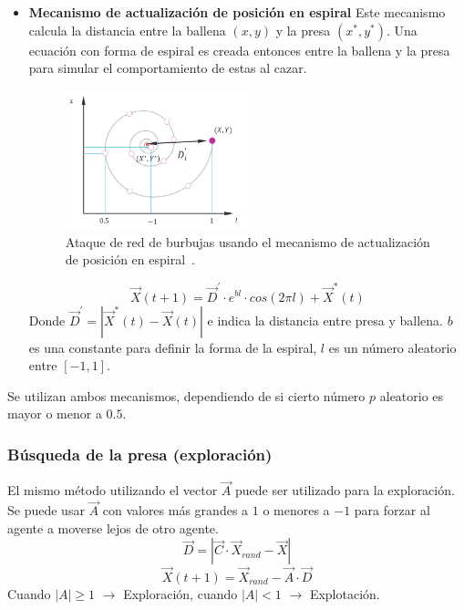 \begin{itemize}
    \item \textbf{Mecanismo de actualización de posición en espiral}
          Este mecanismo calcula la distancia entre la ballena $(x,y)$ y la presa $(x^*, y^*)$. Una ecuación con forma de espiral es creada entonces entre la ballena y la presa para simular el comportamiento de estas al cazar.
          \begin{figure}[H]
              \centering
              \includegraphics[width=0.5\textwidth]{imagenes/spiral-update-position-wao.png}
              \caption[Mecanismo de actualización de posición en espiral]{Ataque de red de burbujas usando el mecanismo de actualización de posición en espiral~\cite{mirjalili_whale_2016}.}
          \end{figure}

          \begin{equation}
              \vec{X}(t+1)=\vec{D}^{'}\cdot e^{bl}\cdot cos(2\pi l)+\vec{X}^*(t)
          \end{equation}
          Donde $\vec{D}^{'}=|\vec{X}^*(t)-\vec{X}(t)|$ e indica la distancia entre presa y ballena. $b$ es una constante para definir la forma de la espiral, $l$ es un número aleatorio entre $[-1,1]$.
\end{itemize}

Se utilizan ambos mecanismos, dependiendo de si cierto número $p$ aleatorio es mayor o menor a $0.5$.

\subsubsection{Búsqueda de la presa (exploración)}
El mismo método utilizando el vector $\vec{A}$ puede ser utilizado para la exploración. Se puede usar $\vec{A}$ con valores más grandes a $1$ o menores a $-1$ para forzar al agente a moverse lejos de otro agente.
\begin{equation}
    \vec{D}=|\vec{C}\cdot\vec{X}_{rand}-\vec{X}|
\end{equation}
\begin{equation}
    \vec{X}(t+1)=\vec{X}_{rand}-\vec{A}\cdot\vec{D}
\end{equation}
Cuando $|A|\geq 1$ $\rightarrow$ Exploración, cuando $|A|<1$ $\rightarrow$ Explotación.

